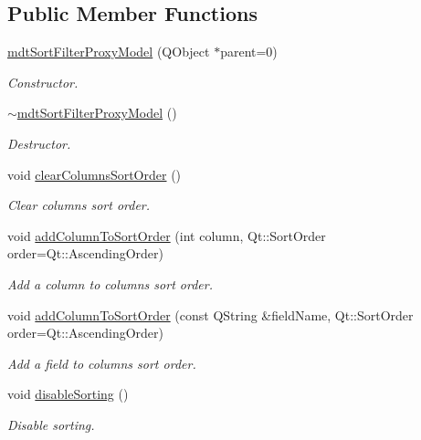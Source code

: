 \subsection*{Public Member Functions}
\begin{DoxyCompactItemize}
\item 
\hyperlink{classmdt_sort_filter_proxy_model_a83bcd157f655c4d675e5a30d97fa16ba}{mdt\-Sort\-Filter\-Proxy\-Model} (Q\-Object $\ast$parent=0)
\begin{DoxyCompactList}\small\item\em Constructor. \end{DoxyCompactList}\item 
\hyperlink{classmdt_sort_filter_proxy_model_a5d1c4647657a13d4b225e790a6b8d1a3}{$\sim$mdt\-Sort\-Filter\-Proxy\-Model} ()
\begin{DoxyCompactList}\small\item\em Destructor. \end{DoxyCompactList}\item 
void \hyperlink{classmdt_sort_filter_proxy_model_aad45b85d23fe3c2eb6198a9eece685d2}{clear\-Columns\-Sort\-Order} ()
\begin{DoxyCompactList}\small\item\em Clear columns sort order. \end{DoxyCompactList}\item 
void \hyperlink{classmdt_sort_filter_proxy_model_a22d0f84ebcc9af078f3c004dbe790fe8}{add\-Column\-To\-Sort\-Order} (int column, Qt\-::\-Sort\-Order order=Qt\-::\-Ascending\-Order)
\begin{DoxyCompactList}\small\item\em Add a column to columns sort order. \end{DoxyCompactList}\item 
void \hyperlink{classmdt_sort_filter_proxy_model_ae447c8f1449b1314fac2448c8b004885}{add\-Column\-To\-Sort\-Order} (const Q\-String \&field\-Name, Qt\-::\-Sort\-Order order=Qt\-::\-Ascending\-Order)
\begin{DoxyCompactList}\small\item\em Add a field to columns sort order. \end{DoxyCompactList}\item 
void \hyperlink{classmdt_sort_filter_proxy_model_adcd8faebb7fb2ccf9f95cbcfea4a1c14}{disable\-Sorting} ()
\begin{DoxyCompactList}\small\item\em Disable sorting. \end{DoxyCompactList}\item 

\end{DoxyCompactItemize}
